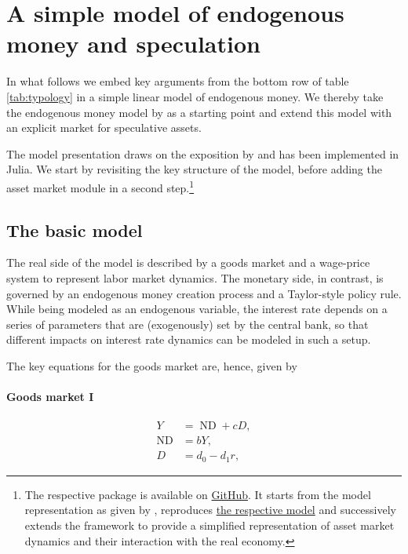 \documentclass[12pt,a4paper]{article}
\DeclareMathOperator{\ND}{ND}
\begin{document}

\section{A simple model of endogenous money and speculation} \label{sec:model}

In what follows we embed key arguments from the bottom row of table \ref{tab:typology} in a simple linear model of endogenous money.
We thereby take the endogenous money model by \citet{fontanaSimpleTeachableMacroeconomic2009} as a starting point and extend this model with an explicit market for speculative assets.

The model presentation draws on the exposition by \citet{DIYMacroeconomicModel} and has been implemented in Julia. We start by revisiting the key structure of the model, before adding the asset market module in a second step.\footnote{The respective package is available on \href{https://github.com/theplatters/PKAssetPrices}{GitHub}. It starts from the model representation as given by \citet{DIYMacroeconomicModel}, reproduces \href{https://macrosimulation.org/a_post_keynesian_macro_model_with_endogenous_money}{the respective model} and successively extends the framework to provide a simplified representation of asset market dynamics and their interaction with the real economy.}


\subsection{The basic model}\label{subsec:basic_model}
The real side of the model is described by a goods market and a wage-price system to represent labor market dynamics. The monetary side, in contrast, is governed by an endogenous money creation process and a Taylor-style policy rule. While being modeled as an endogenous variable, the interest rate depends on a series of parameters that are (exogenously) set by the central bank, so that different impacts on interest rate dynamics can be modeled in such a setup.

The key equations for the goods market are, hence, given by 

\paragraph{Goods market I}
\begin{align}
  Y &= \ND + c D \label{eq:simple_y}, \\
  \ND &= b Y \label{eq:simple_nd}, \\
  D &= d_0 - d_1 r \label{eq:simple_d},
\end{align}
\end{document}
